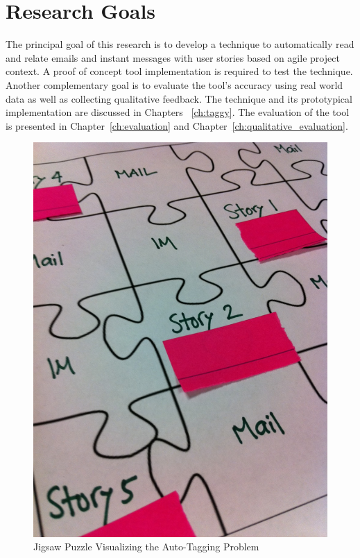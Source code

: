\section{Research Goals}
The principal goal of this research is to develop a technique to automatically read and relate emails and instant messages with user stories based on agile project context. A proof of concept tool implementation is required to test the technique. Another complementary goal is to evaluate the tool's accuracy using real world data as well as collecting qualitative feedback. The technique and its prototypical implementation are discussed in Chapters ~\ref{ch:taggy}. The evaluation of the tool is presented in Chapter~\ref{ch:evaluation} and Chapter~\ref{ch:qualitative_evaluation}.

\begin{figure}[h!]
	\centering
	\includegraphics[width=\textwidth]{Jigsaw.jpg}
    \caption{Jigsaw Puzzle Visualizing the Auto-Tagging Problem}
	\label{fig:jigsaw}
\end{figure}


